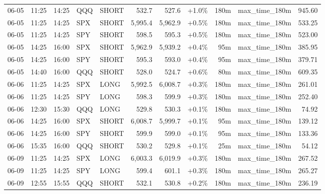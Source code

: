 \documentclass[11pt,a4paper,twoside]{article}
\begin{document}
\begin{center}
\begin{longtable}{>{\color{txtmain}}l l l l l r r r r >{\color{txtmain}}l r}
06-05 & 11:25 & 14:25 & QQQ & SHORT & 532.7 & 527.6 & \textcolor{wingreen}{+1.0\%} & 180m & max\_time\_180m & \textcolor{wingreen}{945.60} \\
06-05 & 11:25 & 14:25 & SPX & SHORT & 5,995.4 & 5,962.9 & \textcolor{wingreen}{+0.5\%} & 180m & max\_time\_180m & \textcolor{wingreen}{533.25} \\
06-05 & 11:25 & 14:25 & SPY & SHORT & 598.5 & 595.3 & \textcolor{wingreen}{+0.5\%} & 180m & max\_time\_180m & \textcolor{wingreen}{523.00} \\
06-05 & 14:25 & 16:00 & SPX & SHORT & 5,962.9 & 5,939.2 & \textcolor{wingreen}{+0.4\%} & 95m & max\_time\_180m & \textcolor{wingreen}{385.95} \\
06-05 & 14:25 & 16:00 & SPY & SHORT & 595.3 & 593.0 & \textcolor{wingreen}{+0.4\%} & 95m & max\_time\_180m & \textcolor{wingreen}{379.71} \\
06-05 & 14:40 & 16:00 & QQQ & SHORT & 528.0 & 524.7 & \textcolor{wingreen}{+0.6\%} & 80m & max\_time\_180m & \textcolor{wingreen}{609.35} \\
06-06 & 11:25 & 14:25 & SPX & LONG & 5,992.5 & 6,008.7 & \textcolor{wingreen}{+0.3\%} & 180m & max\_time\_180m & \textcolor{wingreen}{261.01} \\
06-06 & 11:25 & 14:25 & SPY & LONG & 598.3 & 599.9 & \textcolor{wingreen}{+0.3\%} & 180m & max\_time\_180m & \textcolor{wingreen}{252.40} \\
06-06 & 12:30 & 15:30 & QQQ & LONG & 529.8 & 530.3 & \textcolor{wingreen}{+0.1\%} & 180m & max\_time\_180m & \textcolor{wingreen}{74.92} \\
06-06 & 14:25 & 16:00 & SPX & SHORT & 6,008.7 & 5,999.7 & \textcolor{wingreen}{+0.1\%} & 95m & max\_time\_180m & \textcolor{wingreen}{139.12} \\
06-06 & 14:25 & 16:00 & SPY & SHORT & 599.9 & 599.0 & \textcolor{wingreen}{+0.1\%} & 95m & max\_time\_180m & \textcolor{wingreen}{133.36} \\
06-06 & 15:35 & 16:00 & QQQ & SHORT & 530.2 & 529.8 & \textcolor{wingreen}{+0.1\%} & 25m & max\_time\_180m & \textcolor{wingreen}{54.12} \\
06-09 & 11:25 & 14:25 & SPX & LONG & 6,003.3 & 6,019.9 & \textcolor{wingreen}{+0.3\%} & 180m & max\_time\_180m & \textcolor{wingreen}{267.52} \\
06-09 & 11:25 & 14:25 & SPY & LONG & 599.4 & 601.1 & \textcolor{wingreen}{+0.3\%} & 180m & max\_time\_180m & \textcolor{wingreen}{265.27} \\
06-09 & 12:55 & 15:55 & QQQ & SHORT & 532.1 & 530.8 & \textcolor{wingreen}{+0.2\%} & 180m & max\_time\_180m & \textcolor{wingreen}{236.19} \\

\end{longtable}
\end{center}
\end{document}
